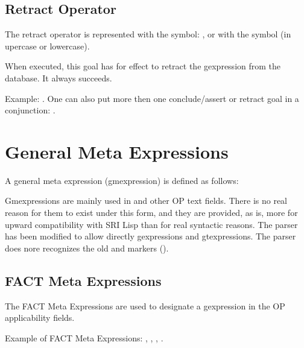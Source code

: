 \subsection{Retract Operator}

The retract operator is represented with the symbol: \samp{~>}, or with the
symbol  (in upercase or lowercase).

When executed, this goal has for effect to retract the gexpression from the
database. It always succeeds.


Example: . One can also put more then one
conclude/assert or retract goal in a conjunction: .

\section{General Meta Expressions}

A general meta expression (gmexpression) is defined as follows:

Gmexpressions are mainly used in  and other OP text
fields. There is no real reason for them to exist under this form, and they are
provided, as is, more for upward compatibility with SRI Lisp \OPRS{} than for
real syntactic reasons. The parser has been modified to allow directly
gexpressions and gtexpressions. The parser does nore recognizes the old
 and  markers ().

\noindent
{} \*
 \*
 \*



\subsection{FACT Meta Expressions}

The FACT Meta Expressions are used to designate a gexpression in the OP
applicability fields.

Example of FACT Meta Expressions:\*
,\*
,\*
,\*
.

